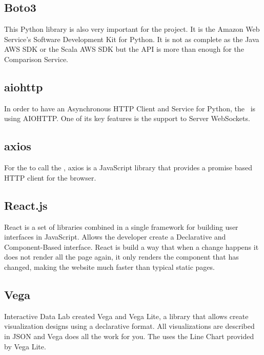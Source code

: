 \subsection*{Boto3\cite{boto3}} \label{boto3}

This Python library is also very important for the project. It is the Amazon Web Service's Software Development Kit for Python. It is not as complete as the Java AWS SDK or the Scala AWS SDK but the  API is more than enough for the Comparison Service.

\subsection*{aiohttp\cite{aiohttp}} \label{aiohttp}

In order to have an Asynchronous HTTP Client and Service for Python, the \thesis\ is using AIOHTTP. One of its key features is the support to Server WebSockets.

\subsection*{axios\cite{axios}} \label{axios}

For the  to call the , axios is a JavaScript library that provides a promise based HTTP client for the browser.

\subsection*{React.js\cite{reactjs}} \label{reactjs}

React is a set of libraries combined in a single framework for building user interfaces in JavaScript. Allows the developer create a Declarative and Component-Based interface. React is build a way that when a change happens it does not render all the page again, it only renders the component that has changed, making the website much faster than typical static pages.

\subsection*{Vega\cite{vega}} \label{vega}

Interactive Data Lab created Vega and Vega Lite, a library that allows create visualization designs using a declarative format. All visualizations are described in JSON\cite{json} and Vega does all the work for you. The  uses the Line Chart provided by Vega Lite.

